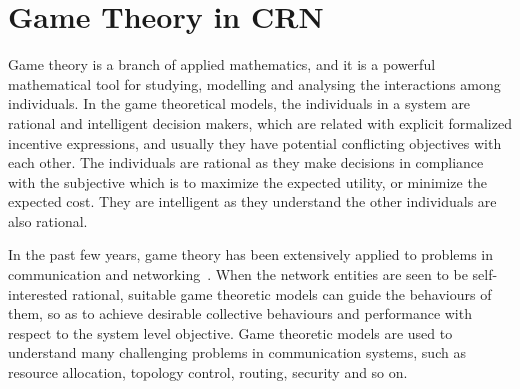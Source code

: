 

\section{Game Theory in CRN}
Game theory is a branch of applied mathematics, and it is a powerful mathematical tool for studying, modelling and analysing the interactions among individuals.
In the game theoretical models, the individuals in a system are rational and intelligent decision makers, which are related with explicit formalized incentive expressions, and usually they have potential conflicting objectives with each other.
The individuals are rational as they make decisions in compliance with the subjective which is to maximize the expected utility, or minimize the expected cost.
They are intelligent as they understand the other individuals are also rational.

In the past few years, game theory has been extensively applied to problems in communication and networking~\cite{Neel06analysisand, Wang_gtc_crn_survey_2010}.
When the network entities are seen to be self-interested rational, suitable game theoretic models can guide the behaviours of them, so as to achieve desirable collective behaviours and performance with respect to the system level objective.
%
Game theoretic models are used to understand many challenging problems in communication systems, such as resource allocation, topology control, routing, security and so on. 

